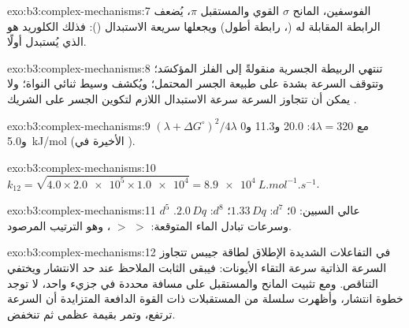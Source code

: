 \begin{solution}{exo:b3:complex-mechanisms:7}
الفوسفين، المانح $\sigma$ القوي والمستقبل $\pi$، يُضعف الرابطة المقابلة له (، رابطة أطول) ويجعلها سريعة الاستبدال (): فذلك الكلوريد هو الذي
يُستبدل أولًا.
\end{solution}

\begin{solution}{exo:b3:complex-mechanisms:8}
تنتهي الربيطة الجسرية منقولةً إلى الفلز المؤكسَد؛ وتتوقف السرعة
بشدة على طبيعة الجسر المحتمل؛ ويُكشف وسيط ثنائي النواة؛ ولا يمكن أن
تتجاوز السرعة سرعة الاستبدال اللازم لتكوين
الجسر على الشريك .
\end{solution}

\begin{solution}{exo:b3:complex-mechanisms:9}
$(\lambda + \Delta G^\circ)^2/4\lambda$ مع $4\lambda = 320$: 20.0 و11.3 و0 و\qty{5.0}{kJ/mol} (الأخيرة في ).
\end{solution}

\begin{solution}{exo:b3:complex-mechanisms:10}
$k_{12} = \sqrt{4.0 \times \num{2.0e5} \times \num{1.0e4}} = \qty{8.9e4}{L.mol^{-1}.s^{-1}}$.
\end{solution}

\begin{solution}{exo:b3:complex-mechanisms:11}
$d^5$ عالي السبين: 0؛ $d^7$: $1.33\,Dq$؛ $d^8$: $2.0\,Dq$. وسرعات تبادل الماء المتوقعة:  $>$  $>$
، وهو الترتيب المرصود.
\end{solution}

\begin{solution}{exo:b3:complex-mechanisms:12}
في التفاعلات الشديدة الإطلاق لطاقة جيبس تتجاوز السرعة الذاتية سرعة التقاء
الأيونات: فيبقى الثابت الملاحظ عند حد الانتشار ويختفي
التناقص. ومع تثبيت المانح والمستقبل على مسافة محددة في جزيء واحد، لا
توجد خطوة انتشار، وأظهرت سلسلة من المستقبلات ذات القوة الدافعة المتزايدة
أن السرعة ترتفع، وتمر بقيمة عظمى ثم تنخفض.
\end{solution}

